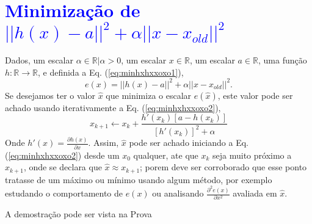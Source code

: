 \section{\textcolor{blue}{Minimização de $||h(x)-a||^2+\alpha ||x-x_{old}||^2$}}

\begin{theorem}\label{theo:minhxhxxoxo}
Dados,
um escalar $\alpha \in \mathbb{R} | \alpha > 0$, 
um escalar $x \in \mathbb{R}$, 
um escalar $a \in \mathbb{R}$,  
uma função $h:\mathbb{R} \rightarrow \mathbb{R}$, e 
definida a Eq. (\ref{eq:minhxhxxoxo1}),
\begin{equation}\label{eq:minhxhxxoxo1}
e(x)=||h(x)-a||^2+\alpha ||x-x_{old}||^2.
\end{equation}
Se desejamos ter o valor $\hat{x}$ que minimiza o escalar $e(\hat{x})$,
este valor pode ser achado usando iterativamente a Eq. (\ref{eq:minhxhxxoxo2}),
\begin{equation}\label{eq:minhxhxxoxo2}
x_{k+1} \leftarrow x_k+
\frac{ h'(x_k) \left[a-h(x_k)\right] }{\left[h'(x_k)\right]^2+\alpha}
\end{equation}
Onde  $h'(x)=\frac{\partial h(x)}{\partial x}$.
Assim, $\hat{x}$ pode ser achado iniciando a Eq. (\ref{eq:minhxhxxoxo2}) desde um $x_{0}$ qualquer, ate que $x_{k}$ seja muito próximo a $x_{k+1}$,
onde se declara que $\hat{x} \approx x_{k+1}$; porem deve ser corroborado
que esse ponto tratasse de um máximo ou mínimo usando algum método, por exemplo estudando o comportamento 
de $e(x)$ ou analisando  $\frac{\partial^2 e(x)}{\partial x^2}$ avaliada em $\hat{x}$.

\FALTAPROVA
A demostração pode ser vista na Prova %
\end{theorem}
